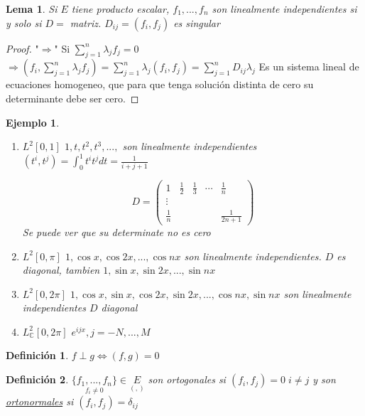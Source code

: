 \documentclass[a4paper,10pt]{book}
\newtheorem{lemma}{Lema}
\newtheorem{ejemplo}{Ejemplo}
\newtheorem{definition}{Definición}
\begin{document}
\begin{lemma}
Si $E$ tiene producto escalar, $f_1,...,f_n$ son linealmente independientes si y solo si
$D=$ matriz.  $D_{ij}= (f_i,f_j)$ es singular 
\end{lemma}

\begin{proof}
"$\Rightarrow$"  Si $\sum\limits_{j=1}^n \lambda_jf_j = 0 $   $\Rightarrow (f_i,\sum\limits_{j=1}^n \lambda_jf_j ) = \sum\limits_{j=1}^n \lambda_j (f_i, f_j ) =  \sum\limits_{j=1}^n  D_{ij} \lambda_j$
Es un sistema lineal de ecuaciones homogeneo, que para que tenga solución distinta de cero su determinante debe ser cero.
\end{proof}

\begin{ejemplo}
    \begin{enumerate}
        \item $L^2[0,1]$  $1,t,t^2,t^3,...,$ son linealmente independientes
        $(t^i, t^j)= \int_0^1 t^i t^j dt = \frac{1}{i+j+1}$

        \[
        D= \left( 
        \begin{array}{ccccc}
            1& \frac{1}{2}& \frac{1}{3}& \cdots& \frac{1}{n} \\
            \vdots & & & &\\
            \frac{1}{n} &&& & \frac{1}{2n+1}
        \end{array}
        \right)
        \]
    Se puede ver que su determinate no es cero    
    \item $L^2[0,\pi]$  $1,\cos x, \cos 2 x, ..., \cos n x$ son linealmente independientes. $D$ es diagonal,
    tambien $1,\sin x, \sin 2 x,..., \sin n x $ 
    \item $L^2 [0,2\pi]$  $1,\cos x, \sin x, \cos 2x, \sin 2x,..., \cos nx, \sin nx $ son linealmente independientes $D$ diagonal
    \item $L^2_{\mathbb{C}}[0,2 \pi]$   $e^{ijx}, j=-N,...,M$
    
    \end{enumerate}
    
\end{ejemplo}

\begin{definition}
$f \perp g  \Leftrightarrow (f,g) = 0$ 
\end{definition}

\begin{definition}
$\underset{f_i\neq 0}{\{f_1,...,f_n\}}\in \underset{(,)}{E}$ son ortogonales si $(f_i,f_j) = 0 \; i\neq j $ y son \underline{ortonormales} si $(f_i,f_j) = \delta_{ij}$ 
\end{definition}
\end{document}

